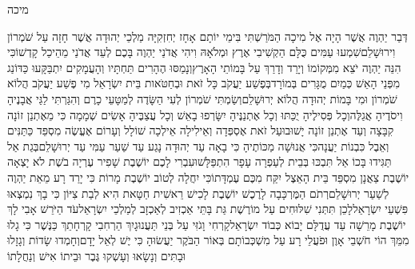 \documentclass[../main/main.tex]{subfiles}
\begin{document}
\thispagestyle{empty}
\Incipit{}מיכה
\cleardoublepage
\RTLmulticolcolumns
\begin{multicols*}{\ncols}
דְּבַר יַהְוֶה אֲשֶׁר הָיָה אֶל מִיכָה הַמֹּרַשְׁתִּי בִּימֵי יוֹתָם אָחָז יְחִזְקִיָּה מַלְכֵי יְהוּדָה אֲשֶׁר חָזָה עַל שֹׁמְרוֹן וִירוּשָׁלֵם\PreVerseSpace{}שִׁמְעוּ עַמִּים כֻּלָּם הַקְשִׁיבִי אֶרֶץ וּמְלֹאָהּ וִיהִי אֲדֹנַי יַהְוֶה בָּכֶם לְעֵד אֲדֹנַי מֵהֵיכַל קָדְשׁוֹ\PreVerseSpace{}כִּי הִנֵּה יַהְוֶה יֹצֵא מִמְּקוֹמוֹ וְיָרַד וְדָרַךְ עַל בָּמוֹתֵי הָאָרֶץ\SubEnd{}\PreVerseSpace{}וְנָמַסּוּ הֶהָרִים תַּחְתָּיו וְהָעֲמָקִים יִתְבַּקָּעוּ כַּדּוֹנַג מִפְּנֵי הָאֵשׁ כְּמַיִם מֻגָּרִים בְּמוֹרָד\PreVerseSpace{}בְּפֶשַׁע יַעֲקֹב כָּל זֹאת וּבְחַטֹּאות בֵּית יִשְׂרָאֵל מִי פֶשַׁע יַעֲקֹב הֲלוֹא שֹׁמְרוֹן וּמִי בָּמוֹת יְהוּדָה הֲלוֹא יְרוּשָׁלֵם\PreVerseSpace{}וְשַׂמְתִּי שֹׁמְרוֹן לְעִי הַשָּׂדֶה לְמַטָּעֵי כָרֶם וְהִגַּרְתִּי לַגַּי אֲבָנֶיהָ וִיסֹדֶיהָ אֲגַלֶּה\PreVerseSpace{}וְכָל פְּסִילֶיהָ יֻכַּתּוּ וְכָל אֶתְנַנֶּיהָ יִשָּׂרְפוּ בָאֵשׁ וְכָל עֲצַבֶּיהָ אָשִׂים שְׁמָמָה כִּי מֵאֶתְנַן זוֹנָה קִבָּצָה וְעַד אֶתְנַן זוֹנָה יָשׁוּבוּ\PreVerseSpace{}עַל זֹאת אֶסְפְּדָה וְאֵילִילָה אֵילְכָה שׁוֹלָל\SubEnd{} וְעָרוֹם אֶעֱשֶׂה מִסְפֵּד כַּתַּנִּים וְאֵבֶל כִּבְנוֹת יַעֲנָה\PreVerseSpace{}כִּי אֲנוּשָׁה מַכּוֹתֶיהָ כִּי בָאָה עַד יְהוּדָה נָגַע עַד שַׁעַר עַמִּי עַד יְרוּשָׁלֵם\PreVerseSpace{}בְּגַת אַל תַּגִּידוּ בָּכוֹ אַל תִּבְכּוּ בְּבֵית לְעַפְרָה עָפָר הִתְפַּלָּשׁוּ\SubEnd{}\PreVerseSpace{}עִבְרִי לָכֶם יוֹשֶׁבֶת שָׁפִיר עֶרְיָה בֹשֶׁת לֹא יָצְאָה יוֹשֶׁבֶת צַאֲנָן מִסְפֵּד\SubEnd{} בֵּית הָאֵצֶל יִקַּח מִכֶּם עֶמְדָּתוֹ\PreVerseSpace{}כִּי יִחֲלָה\SubEnd{} לְטוֹב יוֹשֶׁבֶת מָרוֹת כִּי יָרַד רָע מֵאֵת יַהְוֶה לְשַׁעַר יְרוּשָׁלֵם\PreVerseSpace{}רְתֹם הַמֶּרְכָּבָה לָרֶכֶשׁ יוֹשֶׁבֶת לָכִישׁ רֵאשִׁית חַטָּאת הִיא לְבַת צִיּוֹן כִּי בָךְ נִמְצְאוּ פִּשְׁעֵי יִשְׂרָאֵל\PreVerseSpace{}לָכֵן תִּתְּנִי שִׁלּוּחִים עַל מוֹרֶשֶׁת גַּת בָּתֵּי אַכְזִיב לְאַכְזָב לְמַלְכֵי יִשְׂרָאֵל\PreVerseSpace{}עֹד הַיֹּרֵשׁ אָבִי לָךְ יוֹשֶׁבֶת מָרֵשָׁה עַד עֲדֻלָּם יָבוֹא כְּבוֹד יִשְׂרָאֵל\PreVerseSpace{}קָרְחִי וָגֹזִּי עַל בְּנֵי תַּעֲנוּגָיִךְ הַרְחִבִי קָרְחָתֵךְ כַּנֶּשֶׁר כִּי גָלוּ מִמֵּךְ \ClosedSection{}הוֹי חֹשְׁבֵי אָוֶן וּפֹעֲלֵי רָע עַל מִשְׁכְּבוֹתָם בְּאוֹר הַבֹּקֶר יַעֲשׂוּהָ כִּי יֶשׁ לְאֵל יָדָם\PreVerseSpace{}וְחָמְדוּ שָׂדוֹת וְגָזָלוּ וּבָתִּים וְנָשָׂאוּ וְעָשְׁקוּ גֶּבֶר וּבֵיתוֹ אִישׁ\SubEnd{} וְנַחֲלָתוֹ\OpenSection{}\par

\end{multicols*}
\end{document}
